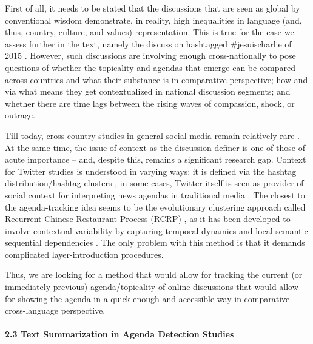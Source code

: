 First of all, it needs to be stated that the discussions that are seen as global by conventional wisdom demonstrate, in reality, high inequalities in language (and, thus, country, culture, and values) representation. This is true for the case we assess further in the text, namely the discussion hashtagged \#jesuischarlie of 2015 \cite{BodrunovaSmoliarovaBlekanov}. However, such discussions are involving enough cross-nationally to pose questions of whether the topicality and agendas that emerge can be compared across countries and what their substance is in comparative perspective; how and via what means they get contextualized in national discussion segments; and whether there are time lags between the rising waves of compassion, shock, or outrage.

Till today, cross-country studies in general social media remain relatively rare \cite{BodrunovaBlekanovSmoliarova}. At the same time, the issue of context as the discussion definer is one of those of acute importance \cite{Bodrunova,Bodrunova2020} -- and, despite this, remains a significant research gap. Context for Twitter studies is understood in varying ways: it is defined via the hashtag distribution/hashtag clusters \cite{AlamRyuLee}, in some cases, Twitter itself is seen as provider of social context for interpreting news agendas in traditional media \cite{KalyanamMantrachSaezTrumper}. The closest to the agenda-tracking idea seems to be the evolutionary clustering approach called Recurrent Chinese Restaurant Process (RCRP) \cite{AhmedXing}, as it has been developed to involve contextual variability by capturing temporal dynamics and local semantic sequential dependencies \cite{LuTanLi}. The only problem with this method is that it demands complicated layer-introduction procedures.

Thus, we are looking for a method that would allow for tracking the current (or immediately previous) agenda/topicality of online discussions that would allow for showing the agenda in a quick enough and accessible way in comparative cross-language perspective.

\paragraph{2.3 Text Summarization in Agenda Detection Studies}

